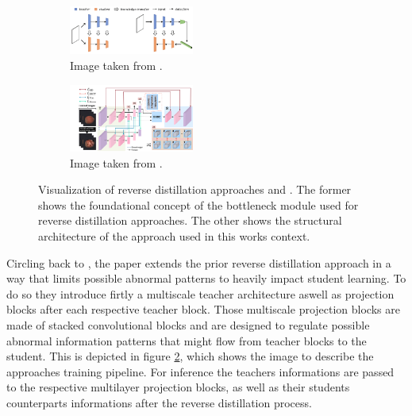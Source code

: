 \begin{figure}[htbp]
    \captionsetup[subfigure]{justification=centering}
    \centering
    \begin{subfigure}[b]{0.3\textwidth} %
        \centering
        \includegraphics[width=0.45\textwidth]{figures/revdist_bottleneck.png}
        \caption{Image taken from \cite{Deng_2022basicrevdist}.}
        \label{fig:revdistbottleneck}
    \end{subfigure}
    \hspace{0.05\textwidth} %
    \begin{subfigure}[b]{0.3\textwidth} %
        \centering
        \includegraphics[width=0.45\textwidth]{figures/revdistpipeline.png}
        \caption{Image taken from \cite{Deng_2022basicrevdist}.}
        \label{fig:revdistpipeline}
    \end{subfigure}
    
    \caption{Visualization of reverse distillation approaches \cite{Deng_2022basicrevdist} and \cite{revdist2023}. The former shows 
    the foundational concept of the bottleneck module used for reverse distillation approaches. The other shows the structural 
    architecture of the approach used in this works context.}
    \label{fig:revdistviz}
\end{figure}


Circling back to \cite{revdist2023}, the paper extends the prior reverse distillation approach in a way that limits possible abnormal patterns to heavily impact student learning. To do so they 
introduce firtly a multiscale teacher architecture aswell as projection blocks after each respective teacher block. Those multiscale projection blocks are made of stacked convolutional blocks 
and are designed to regulate possible abnormal information patterns that might flow from teacher blocks to the student. This is depicted in figure \ref{fig:revdistpipeline}, which shows the image to describe the 
approaches training pipeline. For inference the teachers informations are passed to the respective multilayer projection blocks, as well as their students counterparts informations after the 
reverse distillation process.


